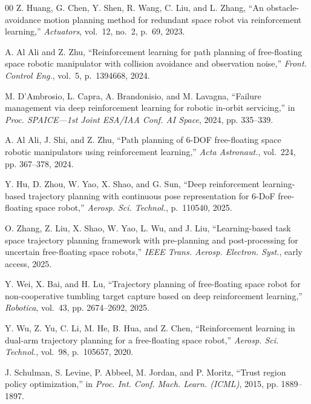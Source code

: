\documentclass{ieeeaccess}
\begin{document}
\begin{thebibliography}{00}
Z. Huang, G. Chen, Y. Shen, R. Wang, C. Liu, and L. Zhang, ``An obstacle-avoidance motion planning method for redundant space robot via reinforcement learning,'' \emph{Actuators}, vol.~12, no.~2, p.~69, 2023.



A. Al Ali and Z. Zhu, ``Reinforcement learning for path planning of free-floating space robotic manipulator with collision avoidance and observation noise,'' \emph{Front. Control Eng.}, vol.~5, p.~1394668, 2024.



M. D'Ambrosio, L. Capra, A. Brandonisio, and M. Lavagna, ``Failure management via deep reinforcement learning for robotic in-orbit servicing,'' in \emph{Proc. SPAICE---1st Joint ESA/IAA Conf. AI Space}, 2024, pp. 335--339.



A. Al Ali, J. Shi, and Z. Zhu, ``Path planning of 6-DOF free-floating space robotic manipulators using reinforcement learning,'' \emph{Acta Astronaut.}, vol.~224, pp. 367--378, 2024.



Y. Hu, D. Zhou, W. Yao, X. Shao, and G. Sun, ``Deep reinforcement learning-based trajectory planning with continuous pose representation for 6-DoF free-floating space robot,'' \emph{Aerosp. Sci. Technol.}, p.~110540, 2025.



O. Zhang, Z. Liu, X. Shao, W. Yao, L. Wu, and J. Liu, ``Learning-based task space trajectory planning framework with pre-planning and post-processing for uncertain free-floating space robots,'' \emph{IEEE Trans. Aerosp. Electron. Syst.}, early access, 2025.



Y. Wei, X. Bai, and H. Lu, ``Trajectory planning of free-floating space robot for non-cooperative tumbling target capture based on deep reinforcement learning,'' \emph{Robotica}, vol.~43, pp. 2674--2692, 2025.



Y. Wu, Z. Yu, C. Li, M. He, B. Hua, and Z. Chen, ``Reinforcement learning in dual-arm trajectory planning for a free-floating space robot,'' \emph{Aerosp. Sci. Technol.}, vol.~98, p.~105657, 2020.



J. Schulman, S. Levine, P. Abbeel, M. Jordan, and P. Moritz, ``Trust region policy optimization,'' in \emph{Proc. Int. Conf. Mach. Learn. (ICML)}, 2015, pp. 1889--1897.




\end{thebibliography}
\end{document}

